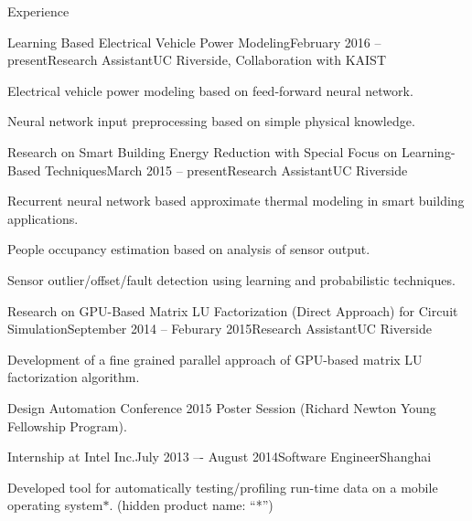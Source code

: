 \documentclass{resume} %
\begin{document}
\begin{rSection}{Experience}

    \begin{rSubsection}{Learning Based Electrical Vehicle Power Modeling}{February 2016 -- present}{Research Assistant}{UC Riverside, Collaboration with KAIST}

    \item Electrical vehicle power modeling based on feed-forward neural network.
    \item Neural network input preprocessing based on simple physical knowledge.

    \end{rSubsection}

    \begin{rSubsection}{Research on Smart Building Energy Reduction with Special Focus on Learning-Based Techniques}{March 2015 -- present}{Research Assistant}{UC Riverside}

    \item Recurrent neural network based approximate thermal modeling in smart building applications.

    \item People occupancy estimation based on analysis of sensor output.

    \item Sensor outlier/offset/fault detection using learning and probabilistic techniques.

    \end{rSubsection}

    \begin{rSubsection}{Research on GPU-Based Matrix LU Factorization (Direct Approach) for Circuit Simulation}{September 2014 -- Feburary 2015}{Research Assistant}{UC Riverside}

    \item Development of a fine grained parallel approach of GPU-based matrix LU factorization algorithm.
    \item Design Automation Conference 2015 Poster Session (Richard Newton Young Fellowship Program).

    \end{rSubsection}


    \begin{rSubsection}{Internship at Intel Inc.}{July 2013 –- August 2014}{Software Engineer}{Shanghai}

    \item Developed tool for automatically testing/profiling run-time data on a
        mobile operating system$*$. (hidden product name: ``*'')


\end{rSubsection}
\end{rSection}
\end{document}
